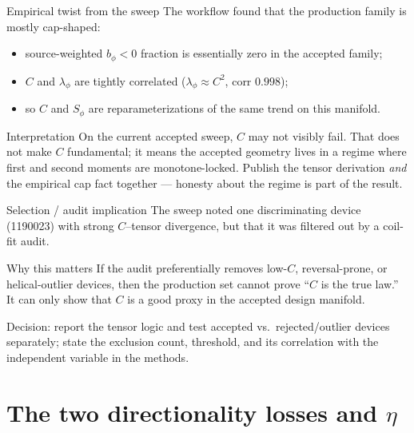 \documentclass[aspectratio=169]{beamer}
\newcommand{\Sphi}{S_\phi}
\newcommand{\lamphi}{\lambda_\phi}
\begin{document}
\begin{frame}[t]{Empirical twist from the sweep}
The workflow found that the production family is mostly cap-shaped:
\begin{itemize}
  \item source-weighted $b_\phi<0$ fraction is essentially zero in the accepted family;
  \item $C$ and $\lamphi$ are tightly correlated ($\lamphi\approx C^2$, corr $0.998$);
  \item so $C$ and $\Sphi$ are reparameterizations of the same trend on this manifold.
\end{itemize}
\vspace{0.5em}
\begin{block}{Interpretation}
On the current accepted sweep, $C$ may not visibly fail. That does not make $C$ fundamental; it means the accepted geometry lives in a regime where first and second moments are monotone-locked. Publish the tensor derivation \emph{and} the empirical cap fact together --- honesty about the regime is part of the result.
\end{block}
\end{frame}

\begin{frame}[t]{Selection / audit implication}
The sweep noted one discriminating device (1190023) with strong $C$--tensor divergence, but that it was filtered out by a coil-fit audit.
\vspace{0.5em}
\begin{block}{Why this matters}
If the audit preferentially removes low-$C$, reversal-prone, or helical-outlier devices, then the production set cannot prove ``$C$ is the true law.'' It can only show that $C$ is a good proxy in the accepted design manifold.
\end{block}
\vspace{0.5em}
Decision: report the tensor logic and test accepted vs.\ rejected/outlier devices separately; state the exclusion count, threshold, and its correlation with the independent variable in the methods.
\end{frame}

\section{The two directionality losses and $\eta$}
\end{document}
